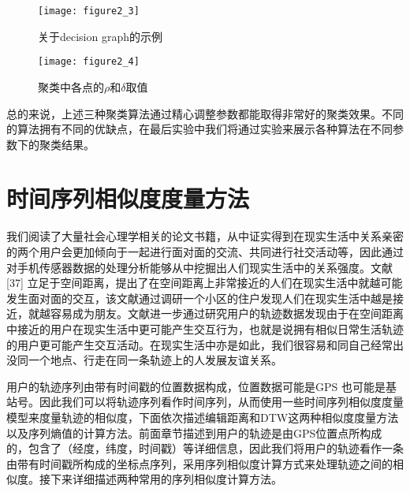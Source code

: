 \begin{figure}[htp]
\centering
\texttt{[image: figure2\_3]}
\caption{关于decision graph的示例}
\label{fig:2_3}
\end{figure}
\begin{figure}[htp]
\centering
\texttt{[image: figure2\_4]}
\caption{聚类中各点的$\rho$和$\delta$取值}
\label{fig:2_4}
\end{figure}
\par 总的来说，上述三种聚类算法通过精心调整参数都能取得非常好的聚类效果。不同的算法拥有不同的优缺点，在最后实验中我们将通过实验来展示各种算法在不同参数下的聚类结果。
\section{时间序列相似度度量方法}
\label{sec:section2-2}
我们阅读了大量社会心理学相关的论文书籍，从中证实得到在现实生活中关系亲密的两个用户会更加倾向于一起进行面对面的交流、共同进行社交活动等，因此通过对手机传感器数据的处理分析能够从中挖掘出人们现实生活中的关系强度。文献[37] 立足于空间距离，提出了在空间距离上非常接近的人们在现实生活中就越可能发生面对面的交互，该文献通过调研一个小区的住户发现人们在现实生活中越是接近，就越容易成为朋友。文献\cite{zajonc1968attitudinal}\cite{zillmann2000mood}进一步通过研究用户的轨迹数据发现由于在空间距离中接近的用户在现实生活中更可能产生交互行为，也就是说拥有相似日常生活轨迹的用户更可能产生交互活动。在现实生活中亦是如此，我们很容易和同自己经常出没同一个地点、行走在同一条轨迹上的人发展友谊关系。
\par 用户的轨迹序列由带有时间戳的位置数据构成，位置数据可能是GPS 也可能是基站号。因此我们可以将轨迹序列看作时间序列，从而使用一些时间序列相似度度量模型来度量轨迹的相似度，下面依次描述编辑距离和DTW这两种相似度度量方法以及序列熵值的计算方法。前面章节描述到用户的轨迹是由GPS位置点所构成的，包含了（经度，纬度，时间戳）等详细信息，因此我们将用户的轨迹看作一条由带有时间戳所构成的坐标点序列，采用序列相似度计算方式来处理轨迹之间的相似度。接下来详细描述两种常用的序列相似度计算方法。
